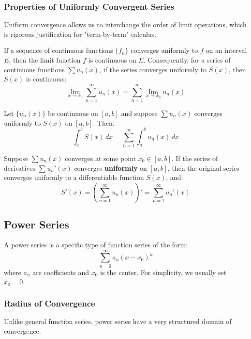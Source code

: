 \documentclass[oneside]{book}
\begin{document}
\subsubsection{Properties of Uniformly Convergent Series}

Uniform convergence allows us to interchange the order of limit operations, which is rigorous justification for "term-by-term" calculus.

\begin{theorem}[Continuity]
If a sequence of continuous functions $\{f_n\}$ converges uniformly to $f$ on an interval $E$, then the limit function $f$ is continuous on $E$.
Consequently, for a series of continuous functions $\sum u_n(x)$, if the series converges uniformly to $S(x)$, then $S(x)$ is continuous:
\[ \lim_{x \to x_0} \sum_{n=1}^{\infty} u_n(x) = \sum_{n=1}^{\infty} \lim_{x \to x_0} u_n(x) \]
\end{theorem}

\begin{theorem}
Let $\{u_n(x)\}$ be continuous on $[a, b]$ and suppose $\sum u_n(x)$ converges uniformly to $S(x)$ on $[a, b]$. Then:
\[ \int_a^b S(x) \, dx = \sum_{n=1}^{\infty} \int_a^b u_n(x) \, dx \]
\end{theorem}

\begin{theorem}
Suppose $\sum u_n(x)$ converges at some point $x_0 \in [a, b]$. If the series of derivatives $\sum u_n'(x)$ converges \textbf{uniformly} on $[a, b]$, then the original series converges uniformly to a differentiable function $S(x)$, and:
\[ S'(x) = \left( \sum_{n=1}^{\infty} u_n(x) \right)' = \sum_{n=1}^{\infty} u_n'(x) \]
\end{theorem}

\subsection{Power Series}

A power series is a specific type of function series of the form:
\[ \sum_{n=0}^{\infty} a_n (x - x_0)^n \]
where $a_n$ are coefficients and $x_0$ is the center. For simplicity, we usually set $x_0 = 0$.

\subsubsection{Radius of Convergence}

Unlike general function series, power series have a very structured domain of convergence.
\end{document}
